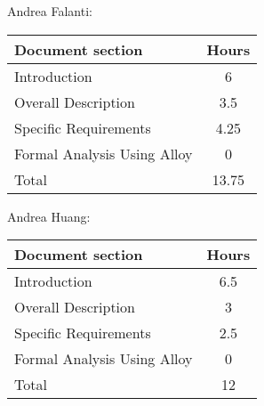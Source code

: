 Andrea Falanti:

\begin{tabular}{|l|c|}
    \hline
    Document section & Hours \\
    \hline
     Introduction & 6\\
     Overall Description & 3.5\\
     Specific Requirements & 4.25\\
     Formal Analysis Using Alloy & 0\\
     \hline
     Total & 13.75\\
     \hline
\end{tabular}
\vskip 0.3in

Andrea Huang:

\begin{tabular}{|l|c|}
    \hline
    Document section & Hours \\
    \hline
     Introduction &  6.5\\
     Overall Description & 3\\
     Specific Requirements & 2.5\\
     Formal Analysis Using Alloy & 0\\
     \hline
     Total & 12\\
     \hline
\end{tabular}